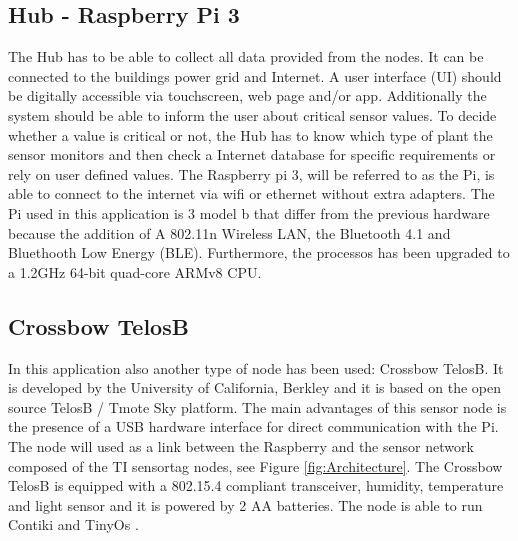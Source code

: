 \subsection{Hub - Raspberry Pi 3}
The Hub has to be able to collect all data provided from the nodes. It can be connected to the buildings power grid and Internet. A user interface (UI) should be digitally accessible via touchscreen, web page and/or app. Additionally the system should be able to inform the user about critical sensor values. To decide whether a value is critical or not, the Hub has to know which type of plant the sensor monitors and then check a Internet database for specific requirements or rely on user defined values.
The Raspberry pi 3, will be referred to as the Pi, is able to connect to the internet via wifi or ethernet without extra adapters. The Pi used in this application is 3 model b that differ from the previous hardware because the addition of A
802.11n Wireless LAN, the Bluetooth 4.1 and Bluethooth Low Energy (BLE). Furthermore, the processos has been upgraded to a 1.2GHz 64-bit quad-core ARMv8 CPU. \cite{pi}\\

\subsection{Crossbow TelosB}
In this application also another type of node has been used: Crossbow TelosB. It is developed by the University of California, Berkley and it is based on the open source TelosB / Tmote Sky platform. 
The main advantages of this sensor node is the presence of a USB hardware interface for direct communication with the Pi. The node will used as a link between the Raspberry and the sensor network composed of the TI sensortag nodes, see Figure \ref{fig:Architecture}.
The Crossbow TelosB is equipped with a 802.15.4 compliant transceiver, humidity, temperature and light sensor and it is powered by 2 AA batteries. The node is able to run Contiki \cite{contiki} and TinyOs \cite{TB}.\\


